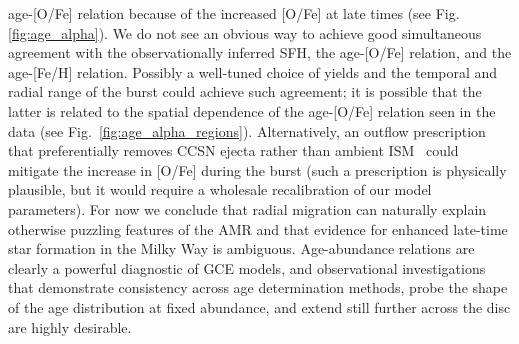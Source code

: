 \documentclass[draft2.tex]{subfiles}
\begin{document}
age-[O/Fe] relation because of the increased [O/Fe] at late times (see Fig. 
\ref{fig:age_alpha}). 
We do not see an obvious way to achieve good simultaneous agreement with the 
observationally inferred SFH, the age-[O/Fe] relation, and the age-[Fe/H] 
relation. 
Possibly a well-tuned choice of yields and the temporal and radial range of 
the burst could achieve such agreement; it is possible that the latter is 
related to the spatial dependence of the age-[O/Fe] relation seen in 
the~\citet{Feuillet2019} data (see Fig.~\ref{fig:age_alpha_regions}). 
Alternatively, an outflow prescription that preferentially removes CCSN 
ejecta rather than ambient ISM~\citep[see, e.g.,][]{Vincenzo2016, Chisholm2018, 
Christensen2018} could mitigate the increase in [O/Fe] during the burst (such a 
prescription is physically plausible, but it would require a wholesale 
recalibration of our model parameters). 
For now we conclude that radial migration can naturally explain otherwise 
puzzling features of the AMR and that evidence for enhanced late-time star 
formation in the Milky Way is ambiguous. 
Age-abundance relations are clearly a powerful diagnostic of GCE models, and 
observational investigations that demonstrate consistency across age 
determination methods, probe the shape of the age distribution at fixed 
abundance, and extend still further across the disc are highly desirable. 
\end{document}
